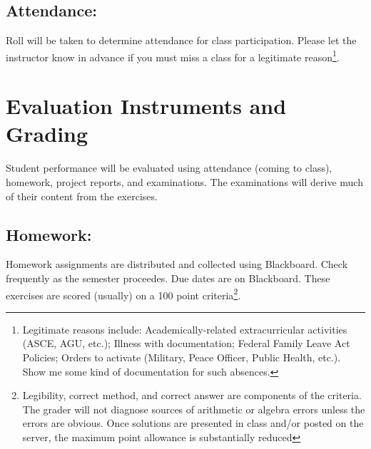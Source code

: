 \documentclass[12pt]{article}
\begin{document}
\subsection*{Attendance:} Roll will be taken to determine attendance for class participation.  Please let the instructor know in advance if you must miss a class for a legitimate reason\footnote{Legitimate reasons include: Academically-related extracurricular activities (ASCE, AGU, etc.); Illness with documentation; Federal Family Leave Act Policies; Orders to activate (Military, Peace Officer, Public Health, etc.).  Show me some kind of documentation for such absences.}. 

\section*{Evaluation Instruments and Grading}
Student performance will be evaluated using attendance (coming to class), homework, project reports, and examinations.   The examinations will derive much of their content from the exercises.  %



\subsection*{Homework:} 
Homework assignments are distributed and collected using Blackboard.  Check frequently as the semester proceedes.  Due dates are on Blackboard.  
These exercises are scored (usually) on a 100 point criteria\footnote{Legibility, correct method, and correct answer are components of the criteria.   
The grader will not diagnose sources of arithmetic or algebra errors unless the errors are obvious.  
Once solutions are presented in class and/or posted on the server, the maximum point allowance is substantially reduced}.
\end{document}
